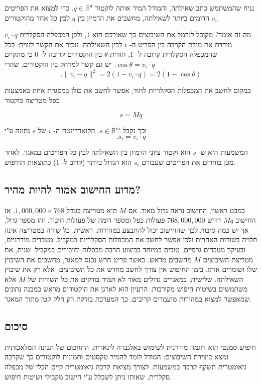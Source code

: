 \documentclass[12pt]{report}
\theoremstyle{plain}
\theoremstyle{definition}
\newcommand{\R}{\mathbb{R}}
\newcommand{\0}{\mathbf{0}}
\begin{document}
נניח שהמשתמש כתב שאילתה, והמודל המיר אותה לוקטור
$q\in\R^d$.
כדי למצוא את הפריטים הדומים ביותר לשאילתה, מחשבים את הדמיון בין
$q$
לבין כל אחד מהוקטורים
$v_i$.

מה זה אומר? מקובל לנרמל את השיבוצים כך שאורכם הוא
$1$,
ולכן המכפלה הסקלרית
$v_i\cdot q$
מודדת את מידת הקרבה בין הפריט ה-
$i$
לבין השאילתה. נזכיר את הקשר לזווית: ככל שהמכפלה הסקלרית קרובה ל-
$1$,
הזווית 
$\theta$
בין הוקטורים קרובה ל-
$0$
כי מתקיים
$\cos\theta=v_i\cdot q$.
יש גם קשר למרחק בין הוקטורים, שהרי
$$
.\|v_i-q\|^2=2(1-v_i\cdot q)=2(1-\cos\theta)
$$

במקום לחשב את המכפלות הסקלריות לחוד, אפשר לחשב את כולן במסגרת אחת באמצעות כפל מטריצה בוקטור

$$
s=Mq
$$

וכך נקבל
$s\in\R^m$.
הקוארדינטה ה-
$i$
של
$s$
נתונה ע"י
$$
.s_i=v_i\cdot q
$$

המשמעות היא ש-
$s$
הוא וקטור ציוני הדמיון בין השאילתה לבין כל הפריטים במאגר.
לאחר מכן בוחרים את הפריטים שעבורם
$s_i$
הוא הגדול ביותר (קרוב ל-
$1$) 
כתוצאות החיפוש.

\subsection*{מדוע החישוב אמור להיות מהיר?}

במבט ראשון, החישוב נראה גדול מאוד.
אם
$M$
היא מטריצה בגודל
$1{,}000{,}000\times 768$,
אז החישוב
$Mq$
דורש
$768{,}000{,}000$
פעולות כפל ומספר דומה של פעולות חיבור. זהו מספר גדול, אך יש כמה סיבות לכך שהחישוב יכול להתבצע במהירות.
ראשית, כל שורה במטריצה אינה תלויה בשורות האחרות ולכן אפשר לחשב את המכפלות הסקלריות במקביל.
מעבדים מודרניים, ובעיקר מעבדים גרפיים, טובים במיוחד בביצוע הרבה מכפלות וחיבורים במקביל.
שנית, את מטריצת השיבוצים
$M$
מחשבים מראש.
כאשר פריט חדש נכנס למאגר, מחשבים את השיבוץ שלו ושומרים אותו. בזמן החיפוש אין צורך לחשב מחדש את כל השיבוצים, אלא רק את שיבוץ השאילתה.
שלישית, במאגרים גדולים מאוד לא תמיד בודקים את כל השורות של
$M$
אלא משתמשים בשיטות חיפוש מקורבות. הרעיון הוא לארגן את הוקטורים מראש במבנה נתונים שמאפשר למצוא במהירות מועמדים קרובים. כך המערכת בודקת רק חלק קטן מתוך המאגר.

\subsection*{סיכום}

חיפוש סמנטי הוא דוגמה מודרנית לשימוש באלגברה לינארית.
התחכום של הבינה המלאכותית נמצא ביצירת השיבוצים:
המודל לומד להמיר טקסטים ותמונות לוקטורים כך שקרבה גיאומטרית תשקף קרבה במשמעות. לצורך מציאת קרבה גיאומטרית קיים הכלי של מכפלה סקלרית, שאותו ניתן לשכלל ע"י חישוב מקבילי ושיטות חיפוש.
\end{document}
